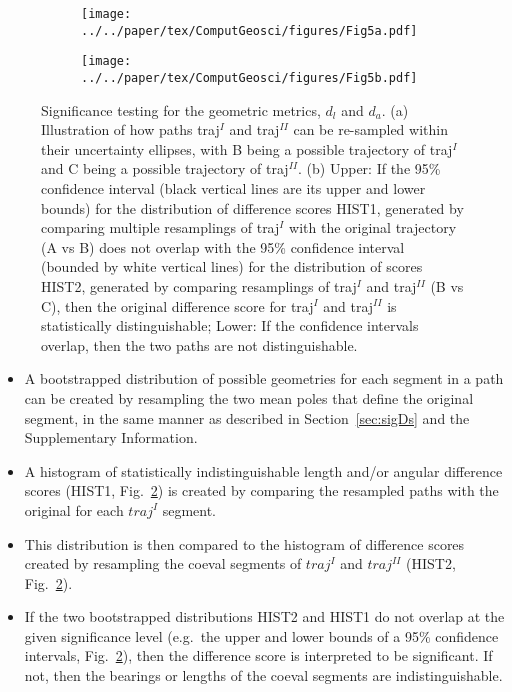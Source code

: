 \begin{figure*}[tbp]
  \captionsetup[subfigure]{singlelinecheck=off,justification=raggedright,aboveskip=-6pt,belowskip=-6pt}
  \centering
  \begin{subfigure}[htbp]{.495\textwidth}
    \centering
    \caption{}\label{fig:Fig5a}
    \texttt{[image: ../../paper/tex/ComputGeosci/figures/Fig5a.pdf]}
  \end{subfigure}
  \begin{subfigure}[htbp]{.495\textwidth}
    \centering
    \caption{}\label{fig:Fig5b}
    \texttt{[image: ../../paper/tex/ComputGeosci/figures/Fig5b.pdf]}
  \end{subfigure}
\caption[Testing on Geometry]{Significance testing for the geometric metrics,
$d_l$ and $d_a$. (a) Illustration of how paths traj$^I$ and traj$^{II}$ can be
re-sampled within their uncertainty ellipses, with B being a possible
trajectory of traj$^I$ and C being a possible trajectory of traj$^{II}$. (b)
Upper: If the 95\% confidence interval (black vertical lines are its upper and
lower bounds) for the distribution of difference scores HIST1, generated by
comparing multiple resamplings of traj$^I$ with the original trajectory (A vs B)
does not overlap with the 95\% confidence interval (bounded by white vertical
lines) for the distribution of scores HIST2, generated by comparing resamplings
of traj$^I$ and traj$^{II}$ (B vs C), then the original difference score for
traj$^I$ and traj$^{II}$ is statistically distinguishable; Lower: If the
confidence intervals overlap, then the two paths are not
distinguishable.}\label{fig:Fig5}
\end{figure*}

\begin{itemize}
\item A bootstrapped distribution of possible geometries for each segment in a
  path can be created by resampling the two mean poles that define the original
  segment, in the same manner as described in Section~\ref{sec:sigDs} and the
  Supplementary Information.
\item A histogram of statistically indistinguishable length and/or angular
  difference scores (HIST1, Fig.~\ref{fig:Fig5b}) is created by comparing the
  resampled paths with the original for each $traj^I$ segment.
\item This distribution is then compared to the histogram of difference scores
  created by resampling the coeval segments of $traj^I$ and $traj^{II}$ (HIST2,
  Fig.~\ref{fig:Fig5b}).
\item If the two bootstrapped distributions HIST2 and HIST1 do not overlap at
  the given significance level (e.g.\ the upper and lower bounds of a 95\%
  confidence intervals, Fig.~\ref{fig:Fig5b}), then the difference score is
  interpreted to be significant. If not, then the bearings or lengths of the
  coeval segments are indistinguishable.
\end{itemize}


